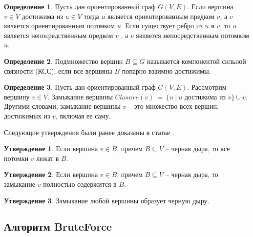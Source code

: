 \documentclass[12pt,a4paper,oneside,openany]{article}
\theoremstyle{definition}
\newtheorem{definition}{Определение}[]
\theoremstyle{lemma}
\newtheorem{lemma}{Утверждение}[]
\theoremstyle{remark}
\begin{document}
\begin{definition}\label{def:successor}
	Пусть дан ориентированный граф $G(V,E)$. Если вершина $v \in V$ достижима из $u \in V$ тогда $u$ является ориентированным предком $v$, а $v$ является ориентированным потомком $u$. Если существует ребро из $u$ в $v$, то $u$ является непосредственным предком $v$ , а $v$ является непосредственным потомком $u$.
\end{definition}

\begin{definition}\label{def:scc}
	Подмножество вершин $B \subseteq G$ называется компонентой сильной связности (КСС), если все вершины $B$ попарно взаимно достижимы.
\end{definition}

\begin{definition}\label{def:closure}
	Пусть дан ориентированный граф $G(V,E)$. Рассмотрим вершину $v \in V$. Замыкание вершины $Closure(v)\ =\ \{u\ |\ u$ достижима из $v\} \cup {v}$.
	Другими словами, замыкание вершины $v$ -- это множество всех вершин, достижимых из $v$, включая ее саму.
\end{definition}

Следующие утверждения были ранее доказаны в статье \cite{li2010detecting}.

\begin{lemma}
	Если вершина $v \in B$, причем $B \subseteq V$ -- черная дыра, то все потомки $v$ лежат в $B$.
\end{lemma}

\begin{lemma}
	Если вершина $v \in B$, причем $B \subseteq V$ -- черная дыра, то замыкание $v$ полностью содержится в $B$.
\end{lemma}

\begin{lemma}\label{lemma:closurebh}
	Замыкание любой вершины образует черную дыру.
\end{lemma}

\subsection{Алгоритм BruteForce}\label{subsec:bruteforce}
\end{document}
